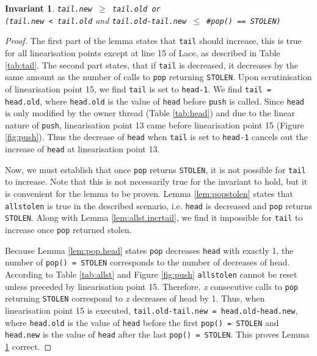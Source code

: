 \documentclass{sig-alternate-br}
\newtheorem{invariant}{Invariant}
\begin{document}
\begin{invariant}
	\texttt{tail.new $\geq$ tail.old or\\(tail.new < tail.old} and \texttt{tail.old-tail.new $\leq$ \#pop() == STOLEN)}
	\label{lem:tail}
\end{invariant}
\begin{proof}
	The first part of the lemma states that \texttt{tail} should increase, this is true for all linearisation points except at line 15 of Lace, as described in Table \ref{tab:tail}.
	The second part states, that if \texttt{tail} is decreased, it decreases by the same amount as the number of calls to \texttt{pop} returning \texttt{STOLEN}.
	Upon scrutinisation of linearisation point 15, we find \texttt{tail} is set to \texttt{head-1}.
	We find \texttt{tail = head.old}, where \texttt{head.old} is the value of \texttt{head} before \texttt{push} is called.
	Since \texttt{head} is only modified by the owner thread (Table \ref{tab:head}) and due to the linear nature of \texttt{push}, linearisation point 13 came before linearisation point 15 (Figure \ref{fig:push}).
	Thus the decrease of \texttt{head} when \texttt{tail} is set to \texttt{head-1} cancels out the increase of \texttt{head} at linearisation point 13.
	
	Now, we must establish that once \texttt{pop} returns \texttt{STOLEN}, it is not possible for \texttt{tail} to increase.
	Note that this is not necessarily true for the invariant to hold, but it is convenient for the lemma to be proven.
	Lemma \ref{lem:popstolen} states that \texttt{allstolen} is true in the described scenario, i.e. \texttt{head} is decreased and \texttt{pop} returns \texttt{STOLEN}.
	Along with Lemma \ref{lem:allst.incrtail}, we find it impossible for \texttt{tail} to increase once \texttt{pop} returned stolen.
	
	Because Lemma \ref{lem:pop.head} states \texttt{pop} decreases \texttt{head} with exactly 1, the number of \texttt{pop() = STOLEN} corresponds to the number of decreases of head.
	According to Table \ref{tab:allst} and Figure \ref{fig:push} \texttt{allstolen} cannot be reset unless preceded by linearisation point 15.
	Therefore, \emph{x} consecutive calls to \texttt{pop} returning \texttt{STOLEN} correspond to \emph{x} decreases of head by 1.
	Thus, when linearisation point 15 is executed, \texttt{tail.old-tail.new = head.old-head.new}, where \texttt{head.old} is the value of \texttt{head} before the first \texttt{pop() = STOLEN} and \texttt{head.new} is the value of \texttt{head} after the last \texttt{pop() = STOLEN}.
	This proves Lemma \ref{lem:tail} correct.
\end{proof}
\end{document}

